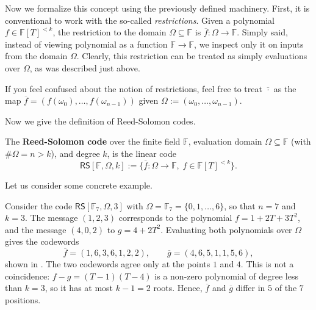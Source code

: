\documentclass[../../book]{subfiles}
\begin{document}
Now we formalize this concept using the previously defined machinery.
First, it is conventional to work with the so-called \emph{restrictions}.
Given a polynomial $f \in \mathbb{F}[T]^{<k}$, the restriction to the domain $\Omega \subseteq \mathbb{F}$ is $\overline{f}: \Omega \to \mathbb{F}$.
Simply said, instead of viewing polynomial as a function $\mathbb{F} \to \mathbb{F}$, we inspect only it on inputs from the domain $\Omega$.
Clearly, this restriction can be treated as simply evaluations over $\Omega$, as was described just above.

\begin{remark}
  If you feel confused about the notion of restrictions, feel free to treat $\overline{\cdot}$ as the map $\overline{f} = (f(\omega_0),\dots,f(\omega_{n-1}))$ given $\Omega := (\omega_0,\dots,\omega_{n-1})$.
\end{remark}

Now we give the definition of Reed-Solomon codes.

\begin{definition}\label{def:rs}
    The \textbf{Reed-Solomon code} over the finite field $\mathbb{F}$, evaluation domain $\Omega \subseteq \mathbb{F}$ (with $\#\Omega = n > k$), and degree $k$, is the linear code
    \begin{equation*}
        \mathsf{RS}[\mathbb{F},\Omega,k] := \{\overline{f}: \Omega \to \mathbb{F}, \; f \in \mathbb{F}[T]^{<k}\}.
    \end{equation*}
\end{definition}

Let us consider some concrete example.

\begin{example}\label{ex:rs}
    Consider the code $\mathsf{RS}[\mathbb{F}_7, \Omega, 3]$ with $\Omega = \mathbb{F}_7 = \{0, 1, \dots, 6\}$, so that $n = 7$ and $k = 3$.
    The message $(1, 2, 3)$ corresponds to the polynomial $f = 1 + 2T + 3T^2$, and the message $(4, 0, 2)$ to $g = 4 + 2T^2$.
    Evaluating both polynomials over $\Omega$ gives the codewords
    \begin{equation*}
        \overline{f} = (1, 6, 3, 6, 1, 2, 2), \qquad \overline{g} = (4, 6, 5, 1, 1, 5, 6),
    \end{equation*}
    shown in .
    The two codewords agree only at the points $1$ and $4$.
    This is not a coincidence: $f - g = (T-1)(T-4)$ is a non-zero polynomial of degree less than $k = 3$, so it has at most $k - 1 = 2$ roots.
    Hence, $\overline{f}$ and $\overline{g}$ differ in $5$ of the $7$ positions.
\end{example}
\end{document}
